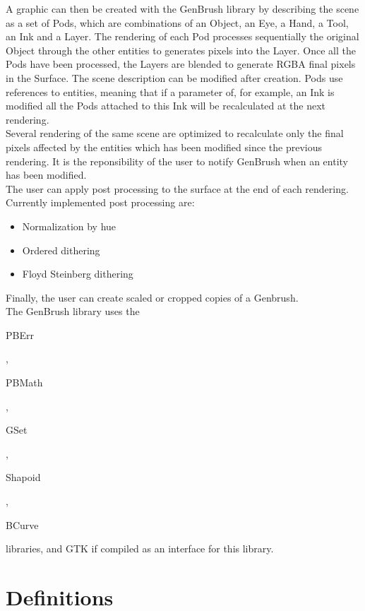 A graphic can then be created with the GenBrush library by describing the scene as a set of Pods, which are combinations of an Object, an Eye, a Hand, a Tool, an Ink and a Layer. The rendering of each Pod processes sequentially the original Object through the other entities to generates pixels into the Layer. Once all the Pods have been processed, the Layers are blended to generate RGBA final pixels in the Surface. The scene description can be modified after creation. Pods use references to entities, meaning that if a parameter of, for example, an Ink is modified all the Pods attached to this Ink will be recalculated at the next rendering.\\

Several rendering of the same scene are optimized to recalculate only the final pixels affected by the entities which has been modified since the previous rendering. It is the reponsibility of the user to notify GenBrush when an entity has been modified.\\

The user can apply post processing to the surface at the end of each rendering. Currently implemented post processing are:\\
\begin{itemize}
\item Normalization by hue
\item Ordered dithering
\item Floyd Steinberg dithering
\end{itemize}

Finally, the user can create scaled or cropped copies of a Genbrush.\\

The GenBrush library uses the \begin{ttfamily}PBErr\end{ttfamily}, \begin{ttfamily}PBMath\end{ttfamily}, \begin{ttfamily}GSet\end{ttfamily}, \begin{ttfamily}Shapoid\end{ttfamily}, \begin{ttfamily}BCurve\end{ttfamily} libraries, and GTK if compiled as an interface for this library.\\

\section{Definitions}

